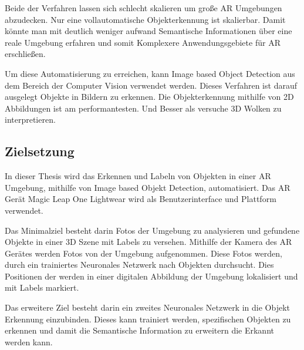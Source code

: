 Beide der Verfahren lassen sich schlecht skalieren um große AR Umgebungen abzudecken. Nur eine vollautomatische Objekterkennung ist skalierbar. Damit könnte man mit deutlich weniger aufwand Semantische Informationen über eine reale Umgebung erfahren und somit Komplexere Anwendungsgebiete für AR erschließen.

Um diese Automatisierung zu erreichen, kann Image based Object Detection aus dem Bereich der Computer Vision verwendet werden.
Dieses Verfahren ist darauf ausgelegt Objekte in Bildern zu erkennen. Die Objekterkennung mithilfe von 2D Abbildungen ist am performantesten.
Und Besser als versuche 3D Wolken zu interpretieren.\citep{introToCNN}


\subsection{Zielsetzung}

In dieser Thesis wird das Erkennen und Labeln von Objekten in einer AR Umgebung, mithilfe von Image based Objekt Detection, automatisiert. 
Das AR Gerät Magic Leap One Lightwear wird als Benutzerinterface und Plattform verwendet.


Das Minimalziel besteht darin Fotos der Umgebung zu analysieren und gefundene Objekte in einer 3D Szene mit Labels zu versehen. 
Mithilfe der Kamera des AR Gerätes werden Fotos von der Umgebung aufgenommen. Diese Fotos werden, durch ein trainiertes Neuronales Netzwerk nach Objekten durchsucht. Dies Positionen der werden in einer digitalen Abbildung der Umgebung lokalisiert und mit Labels markiert.

Das erweitere Ziel besteht darin ein zweites Neuronales Netzwerk in die Objekt Erkennung einzubinden. Dieses kann trainiert werden, spezifischen Objekten zu erkennen und damit die Semantische Information zu erweitern die Erkannt werden kann.

